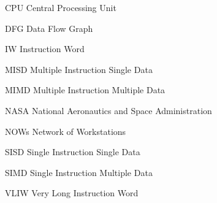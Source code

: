 \begin{siglas}
        \item[CPU] Central Processing Unit

        \item [DFG] Data Flow Graph

        \item[IW] Instruction Word 

        \item[MISD] Multiple Instruction Single Data
        \item[MIMD] Multiple Instruction Multiple Data

        \item [NASA] National Aeronautics and Space Administration
        \item [NOWs] Network of Workstations

        \item[SISD] Single Instruction Single Data
        \item[SIMD] Single Instruction Multiple Data


        \item[VLIW] Very Long Instruction Word
\end{siglas}
